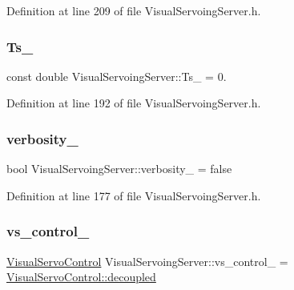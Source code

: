 Definition at line 209 of file Visual\+Servoing\+Server.\+h.

\mbox{\label{classVisualServoingServer_a48bcc91d15c80f7b3b248fa205e8e3de}} 
\subsubsection{\texorpdfstring{Ts\+\_\+}{Ts\_}}
{\footnotesize\ttfamily const double Visual\+Servoing\+Server\+::\+Ts\+\_\+ = 0.\hspace{0.3cm}{\ttfamily [private]}}



Definition at line 192 of file Visual\+Servoing\+Server.\+h.

\mbox{\label{classVisualServoingServer_a559b6106818be3b9c48352b614e658c7}} 
\subsubsection{\texorpdfstring{verbosity\+\_\+}{verbosity\_}}
{\footnotesize\ttfamily bool Visual\+Servoing\+Server\+::verbosity\+\_\+ = false\hspace{0.3cm}{\ttfamily [private]}}



Definition at line 177 of file Visual\+Servoing\+Server.\+h.

\mbox{\label{classVisualServoingServer_ac8da8eea9620e8cce4ba2502bb1ec86a}} 
\subsubsection{\texorpdfstring{vs\+\_\+control\+\_\+}{vs\_control\_}}
{\footnotesize\ttfamily \hyperlink{classVisualServoingServer_ad7f000a91f0fc3423b86f2d2a584c4d3}{Visual\+Servo\+Control} Visual\+Servoing\+Server\+::vs\+\_\+control\+\_\+ = \hyperlink{classVisualServoingServer_ad7f000a91f0fc3423b86f2d2a584c4d3a8c5f04f9df63b44bea9b7edcb4dd1038}{Visual\+Servo\+Control\+::decoupled}\hspace{0.3cm}{\ttfamily [private]}}



